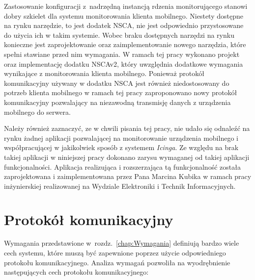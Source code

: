 Zastosowanie konfiguracji z~nadrzędną instancją rdzenia monitorującego
stanowi dobry szkielet dla systemu monitorowania klienta
mobilnego. Niestety dostępne na rynku narzędzie, to jest dodatek NSCA,
nie jest odpowiednio przystosowane do użycia ich w takim
systemie. Wobec braku dostępnych narzędzi na rynku konieczne jest
zaprojektowanie oraz zaimplementowanie nowego narzędzia, które spełni
stawiane przed nim wymagania. W ramach tej pracy wykonano projekt oraz
implementację dodatku NSCAv2, który uwzględnia dodatkowe wymagania
wynikające z monitorowania klienta mobilnego. Ponieważ protokół
komunikacyjny używany w dodatku NSCA jest również niedostosowany do
potrzeb klienta mobilnego w ramach tej pracy zaproponowano nowy
protokół komunikacyjny pozwalający na niezawodną transmisję danych z
urządzenia mobilnego do serwera.

Należy również zaznaczyć, ze w chwili pisania tej pracy, nie udało się
odnaleźć na rynku żadnej aplikacji pozwalającej na monitorowanie
urządzenia mobilnego i współpracującej w jakikolwiek sposób z systemem
{\em Icinga}. Ze względu na brak takiej aplikacji w niniejszej pracy
dokonano zarysu wymaganej od takiej aplikacji
funkcjonalności. Aplikacja realizująca i rozszerzająca tą
funkcjonalność została zaprojektowana i zaimplementowana przez Pana
Marcina Kubika w ramach pracy inżynierskiej\cite{book:pracaKubika}
realizowanej na Wydziale Elektroniki i Technik Informacyjnych.


\section[Protokół komunikacyjny][Protokół komunikacyjny]{Protokół komunikacyjny}
\label{sec:ProtKom}

Wymagania przedstawione w~rozdz.~\ref{chap:Wymagania} definiują bardzo wiele
cech systemu, które muszą być zapewnione poprzez użycie odpowiedniego
protokołu komunikacyjnego. Analiza wymagań pozwoliła na wyodrębnienie
następujących cech protokołu komunikacyjnego:

